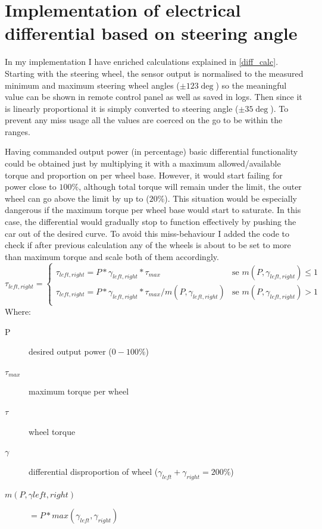 \section{Implementation of electrical differential based on steering angle}\label{diff_meth}
In my implementation I have enriched calculations explained in \ref{diff_calc}. Starting with the steering wheel, the sensor output is normalised to the measured minimum and maximum steering wheel angles ($\pm123\deg$) so the meaningful value can be shown in remote control panel as well as saved in logs. 
Then since it is linearly proportional it is simply converted to steering angle ($\pm35\deg$). To prevent any miss usage all the values are coerced on the go to be within the ranges.

Having commanded output power (in percentage) basic differential functionality could be obtained just by multiplying it with a maximum allowed/available torque and proportion on per wheel base. However, it would start failing for power close to $100\% $, although total torque will remain under the limit, the outer wheel can go above the limit by up to ($20\% $).
This situation would be especially dangerous if the maximum torque per wheel base would start to saturate. In this case, the differential would gradually stop to function effectively by pushing the car out of the desired curve.
To avoid this miss-behaviour I added the code to check if after previous calculation any of the wheels is about to be set to more than maximum torque and scale both of them accordingly.
\begin{equation}\label{diff_saf}
    \tau_{left,right} = \begin{cases}
        \tau_{left,right} = P * \gamma_{left,right} * \tau_{max} & \text{se $m(P,\gamma_{left,right}) \leq 1$}\\
        \tau_{left,right} = P * \gamma_{left,right} * \tau_{max} / m(P,\gamma_{left,right}) & \text{se $m(P,\gamma_{left,right}) > 1$}\\
    \end{cases}
\end{equation}
Where:
\begin{description}
    \item[P] desired output power ($0-100\%$)
    \item[$\tau_{max}$] maximum torque per wheel
    \item[$\tau$] wheel torque
    \item[$\gamma$] differential disproportion of wheel ($\gamma_{left}+\gamma_{right}=200\%$)
    \item[$m(P,\gamma{left,right})$] $= P * max(\gamma_{left},\gamma_{right})$
\end{description}

